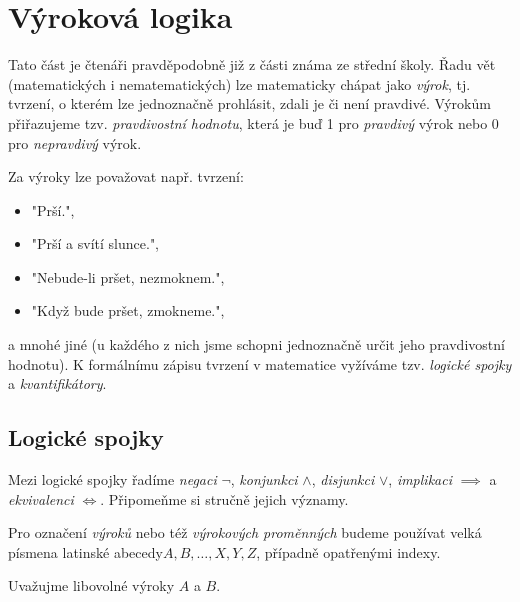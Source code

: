 \section{Výroková logika}\label{sec:vyrokova_logika}

Tato část je čtenáři pravděpodobně již z části známa ze střední školy. Řadu vět (matematických i nematematických) lze matematicky chápat jako \emph{výrok}, tj. tvrzení, o kterém lze jednoznačně prohlásit, zdali je či není pravdivé. Výrokům přiřazujeme tzv. \emph{pravdivostní hodnotu}, která je buď 1 pro \emph{pravdivý} výrok nebo 0 pro \emph{nepravdivý} výrok.\par
Za výroky lze považovat např. tvrzení:
\begin{itemize}
    \item "Prší.",
    \item "Prší a svítí slunce.",
    \item "Nebude-li pršet, nezmoknem.",
    \item "Když bude pršet, zmokneme.",
\end{itemize}
a mnohé jiné (u každého z nich jsme schopni jednoznačně určit jeho pravdivostní hodnotu). K formálnímu zápisu tvrzení v matematice vyžíváme tzv. \emph{logické spojky} a \emph{kvantifikátory}.

\subsection{Logické spojky}\label{subsec:logicke_spojky}

Mezi logické spojky řadíme \emph{negaci} $\neg$, \emph{konjunkci} $\land$, \emph{disjunkci} $\lor$, \emph{implikaci} $\implies$ a \emph{ekvivalenci} $\iff$. Připomeňme si stručně jejich významy.

\begin{convention}
    \label{conv:abeceda_vyrokovych_promennych}
    Pro označení \emph{výroků} nebo též \emph{výrokových proměnných} budeme používat velká písmena latinské abecedy\linebreak $A,B,\dots,X,Y,Z$, případně opatřenými indexy.
\end{convention}

Uvažujme libovolné výroky $A$ a $B$.

